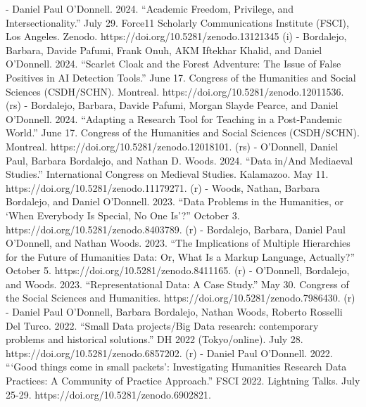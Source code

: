 - Daniel Paul O’Donnell. 2024. “Academic Freedom, Privilege, and Intersectionality.” July 29.  Force11 Scholarly Communications Institute (FSCI), Los Angeles. Zenodo. https:/\allowbreak{}/\allowbreak{}doi.org/\allowbreak{}10.5281/\allowbreak{}zenodo.13121345 (i)
- Bordalejo, Barbara, Davide Pafumi\*, Frank Onuh\*, AKM Iftekhar Khalid\*, and Daniel O’Donnell. 2024. “Scarlet Cloak and the Forest Adventure: The Issue of False Positives in AI Detection Tools.” June 17. Congress of the Humanities and Social Sciences (CSDH/\allowbreak{}SCHN). Montreal. https:/\allowbreak{}/\allowbreak{}doi.org/\allowbreak{}10.5281/\allowbreak{}zenodo.12011536. (rs)
- Bordalejo, Barbara, Davide Pafumi, Morgan Slayde Pearce\*, and Daniel O’Donnell. 2024. “Adapting a Research Tool for Teaching in a Post-Pandemic World.” June 17. Congress of the Humanities and Social Sciences (CSDH/\allowbreak{}SCHN). Montreal.  https:/\allowbreak{}/\allowbreak{}doi.org/\allowbreak{}10.5281/\allowbreak{}zenodo.12018101. (rs)
- O’Donnell, Daniel Paul, Barbara Bordalejo, and Nathan D. Woods. 2024. “Data in/\allowbreak{}And Mediaeval Studies.” International Congress on Medieval Studies. Kalamazoo. May 11. https:/\allowbreak{}/\allowbreak{}doi.org/\allowbreak{}10.5281/\allowbreak{}zenodo.11179271. (r)
- Woods, Nathan, Barbara Bordalejo, and Daniel O’Donnell. 2023. “Data Problems in the Humanities, or ‘When Everybody Is Special, No One Is’?” October 3. https:/\allowbreak{}/\allowbreak{}doi.org/\allowbreak{}10.5281/\allowbreak{}zenodo.8403789. (r)
- Bordalejo, Barbara, Daniel Paul O’Donnell, and Nathan Woods. 2023. “The Implications of Multiple Hierarchies for the Future of Humanities Data: Or, What Is a Markup Language, Actually?” October 5. https:/\allowbreak{}/\allowbreak{}doi.org/\allowbreak{}10.5281/\allowbreak{}zenodo.8411165. (r)
- O’Donnell, Bordalejo, and Woods. 2023. “Representational Data:  A Case Study.” May 30.  Congress of the Social Sciences and Humanities. https:/\allowbreak{}/\allowbreak{}doi.org/\allowbreak{}10.5281/\allowbreak{}zenodo.7986430. (r)
- Daniel Paul O’Donnell, Barbara Bordalejo, Nathan Woods, Roberto Rosselli Del Turco. 2022. “Small Data projects/\allowbreak{}Big Data research: contemporary problems and historical solutions.” DH 2022 (Tokyo/\allowbreak{}online). July 28. https:/\allowbreak{}/\allowbreak{}doi.org/\allowbreak{}10.5281/\allowbreak{}zenodo.6857202. (r)
- Daniel Paul O’Donnell. 2022. “‘Good things come in small packets’: Investigating Humanities Research Data Practices: A Community of Practice Approach.” FSCI 2022. Lightning Talks. July 25-29. https:/\allowbreak{}/\allowbreak{}doi.org/\allowbreak{}10.5281/\allowbreak{}zenodo.6902821.

